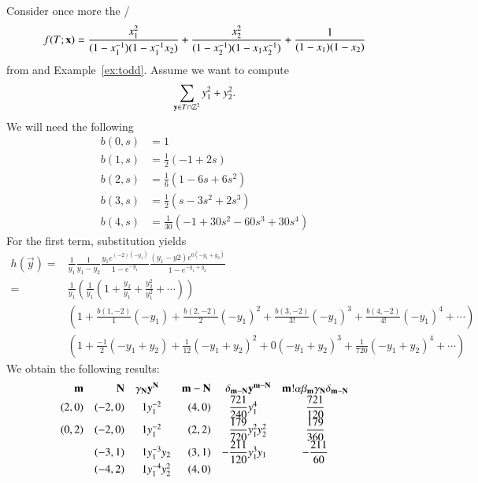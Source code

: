 \begin{example}
Consider once more the \rgf/
$$
\f T x =
\frac{x_1^2}{(1-x_1^{-1})(1-x_1^{-1}x_2)}
+
\frac{x_2^2}{(1-x_2^{-1})(1-x_1 x_2^{-1})}
+
\frac1{(1-x_1)(1-x_2)}
$$
from 
and Example~\ref{ex:todd}.
Assume we want to compute
$$
\sum_{\vec y \in T\cap \ZZ^2} y_1^2 + y_2^2
.
$$
We will need the following 
\begin{align*}
b(0,s) & = 1
\\
b(1,s) &= \frac 1 2 \left(-1 + 2 s \right)
\\
b(2,s) &= \frac 1 6 \left(1 -6 s + 6 s^2 \right)
\\
b(3,s) &= \frac 1 2 \left(s -3 s^2 + 2 s^3\right)
\\
b(4,s) & = \frac 1{30} \left(-1 + 30 s^2 -60 s^3 + 30 s^4\right)
\end{align*}
For the first term, substitution yields
\begin{align*}
h(\vec y)
=&
\frac 1{y_1}
\frac 1{y_1-y_2}
\frac {y_1 e^{(-2)(-y_1)}}{1-e^{-y_1}}
\frac {(y_1-y2) e^{0(-y_1+y_2)}}{1-e^{-y_1+y_2}}
\\
=&
\frac 1{y_1}
\left(
    \frac 1{y_1} \left(
		1 + \frac{y_2}{y_1} + \frac{y_2^2}{y_1^2} + \cdots
	\right)
\right)
\\
&
\left(
1 + \frac{b(1,-2)}1 (-y_1) + \frac{b(2,-2)}2 (-y_1)^2
	+ \frac{b(3,-2)}{3!} (-y_1)^3 + \frac{b(4,-2)}{4!} (-y_1)^4 + \cdots
\right)
\\
&
\left(
1 + \frac{-1}2 (-y_1+y_2) + \frac{1}{12} (-y_1+y_2)^2
	+ 0 (-y_1+y_2)^3
	+ \frac{1}{720} (-y_1+y_2)^4 + \cdots
\right)
\end{align*}
We obtain the following results:
{\renewcommand\arraystretch{2}
$$
\begin{array}{rrr@{}lrr@{}lc}
\vec m & \vec N & \gamma_{\vec N} & \vec y^{\vec N} &
\vec m - \vec N & \delta_{\vec m - \vec N} & \vec y^{\vec m - \vec N} &
\vec m! \alpha \beta_{\vec m} \gamma_{\vec N} \delta_{\vec m - \vec N}
\\
(2,0) & (-2,0) & 1 & y_1^{-2} & (4,0)
		& \displaystyle\frac{721}{240} & y_1^4
		& \displaystyle\frac{721}{120}
\\
(0,2) & (-2,0) & 1 & y_1^{-2} & (2,2)
		& \displaystyle\frac{179}{720} & y_1^2 y_2^2
		& \displaystyle\frac{179}{360}
\\
      & (-3,1) & 1 & y_1^{-3} y_2 & (3,1)
		& \displaystyle-\frac{211}{120} & y_1^3 y_1
		& \displaystyle-\frac{211}{60}
\\
      & (-4,2) & 1 & y_1^{-4} y_2^2 & (4,0)

\end{array}$$}
\end{example}
